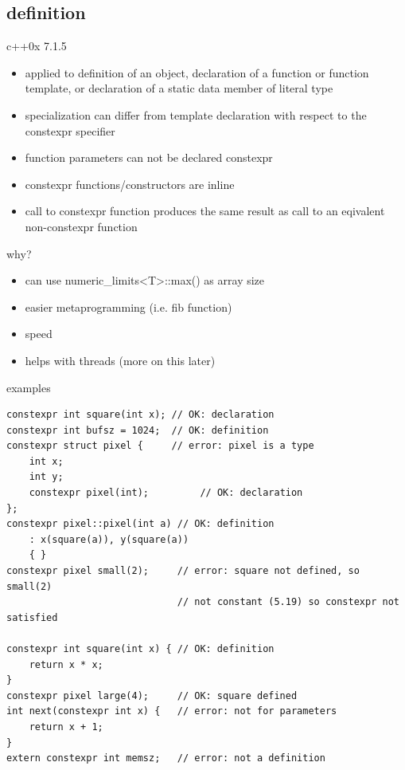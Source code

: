 \documentclass{beamer}
\begin{document}
\subsection{definition}
\begin{frame}{c++0x 7.1.5}
  \begin{block}{}
    \begin{itemize}
    \item applied to definition of an object, declaration of a
      function or function template, or declaration of a static data
      member of literal type
    \item specialization can differ from template declaration with
      respect to the constexpr specifier
    \item function parameters can not be declared constexpr
    \item constexpr functions/constructors are inline
    \item call to constexpr function produces the same result as call
      to an eqivalent non-constexpr function
    \end{itemize}
  \end{block}
\end{frame}

\begin{frame}{why?}
  \begin{block}{}
    \begin{itemize}
    \item can use numeric\_limits<T>::max() as array size
    \item easier metaprogramming (i.e. fib function)
    \item speed
    \item helps with threads (more on this later)
    \end{itemize}
  \end{block}
\end{frame}

\begin{frame}[fragile]{examples}
  \begin{block}{}
\tiny{
\begin{verbatim}
constexpr int square(int x); // OK: declaration
constexpr int bufsz = 1024;  // OK: definition
constexpr struct pixel {     // error: pixel is a type
    int x;
    int y;
    constexpr pixel(int);         // OK: declaration
};
constexpr pixel::pixel(int a) // OK: definition
    : x(square(a)), y(square(a))
    { }
constexpr pixel small(2);     // error: square not defined, so small(2)
                              // not constant (5.19) so constexpr not satisfied

constexpr int square(int x) { // OK: definition
    return x * x;
}
constexpr pixel large(4);     // OK: square defined
int next(constexpr int x) {   // error: not for parameters
    return x + 1;
}
extern constexpr int memsz;   // error: not a definition

\end{verbatim}
}
  \end{block}
\end{frame}
\end{document}
